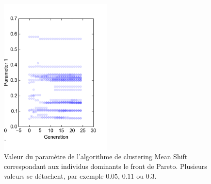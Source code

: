 \documentclass[draft]{llncs}
\begin{document}

\begin{figure}[ht]
  \begin{center}
    \includegraphics[width=0.5\textwidth]{figures/Pareto_front.pdf}
    \caption{Valeur du paramètre de l'algorithme de clustering Mean Shift correspondant aux individus dominants le front de Pareto. Plusieurs valeurs se détachent, par exemple $0.05$, $0.11$ ou $0.3$.}
    \label{fig:pareto_front}
  \end{center}
\end{figure}
\end{document}
